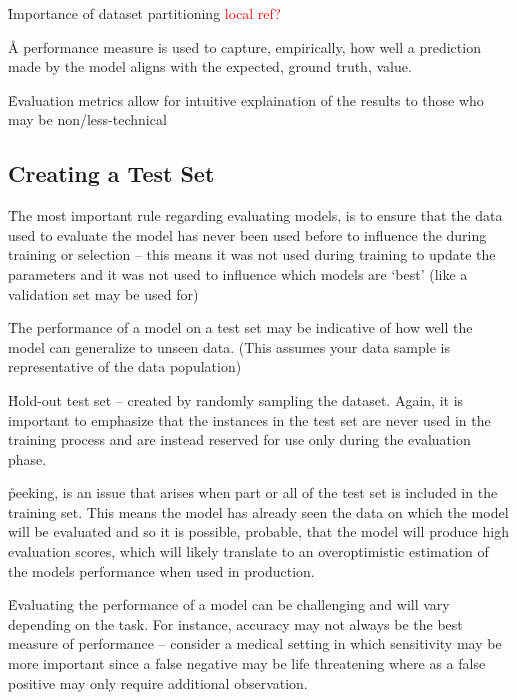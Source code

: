 
\r{Importance of dataset partitioning \textcolor{red}{local ref?}}


\r{A performance measure is used to capture, empirically, how well a prediction made by the model aligns with the expected, ground truth, value.}

\r{Evaluation metrics allow for intuitive explaination of the results to those who may be non/less-technical}

\subsection{Creating a Test Set}

\r{The most important rule regarding evaluating models, is to ensure that the data used to evaluate the model has never been used before to influence the during training or selection -- this means it was not used during training to update the parameters and it was not used to influence which models are `best' (like a validation set may be used for)}

\r{The performance of a model on a test set may be indicative of how well the model can generalize to unseen data. (This assumes your data sample is representative of the data population)}

\r{Hold-out test set -- created by randomly sampling the dataset. Again, it is important to emphasize that the instances in the test set are never used in the training process and are instead reserved for use only during the evaluation phase.}

\r{peeking, is an issue that arises when part or all of the test set is included in the training set. This means the model has already seen the data on which the model will be evaluated and so it is possible, probable, that the model will produce high evaluation scores, which will likely translate to an overoptimistic estimation of the models performance when used in production.}

\r{Evaluating the performance of a model can be challenging and will vary depending on the task. For instance, accuracy may not always be the best measure of performance -- consider a medical setting in which sensitivity may be more important since a false negative may be life threatening where as a false positive may only require additional observation.}

